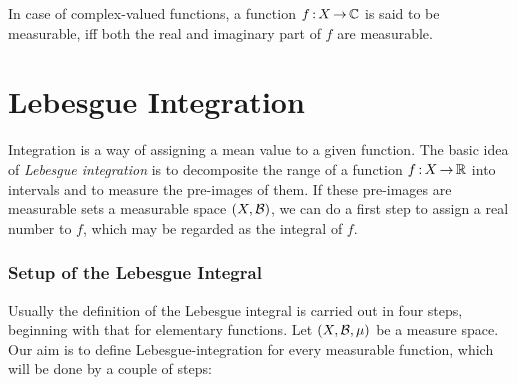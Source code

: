 \documentclass[11pt,twoside]{article}
\begin{document}
\subparagraph{}
In case of complex-valued functions,
a function $f {\,:\,} X {\,\to\,} {\mathbb{C}}$ is said to be measurable,
iff both the real and imaginary part of $f$ are measurable.

\newpage
\thispagestyle{empty}
\part{Lebesgue Integration}                                                    %
Integration is a way of assigning a mean value to a given function.
The basic idea of \textit{Lebesgue integration} is to decomposite
the range of a function $f {\,:\,} X {\,\to\,} {\mathbb{R}}$ into intervals
and to measure the pre-images of them.
If these pre-images are measurable sets {\wrt} a measurable space $(X,{\mathcal{B}})$,
we can do a first step to assign a real number to $f$,
which may be regarded as the integral of $f$.

\section{Setup of the Lebesgue Integral}
Usually the definition of the Lebesgue integral is carried out in four steps,
beginning with that for elementary functions.
Let $(X, {\mathcal{B}}, \mu)$ be a measure space.
Our aim is to define Lebesgue-integration for every measurable function,
which will be done by a couple of steps:
\end{document}

